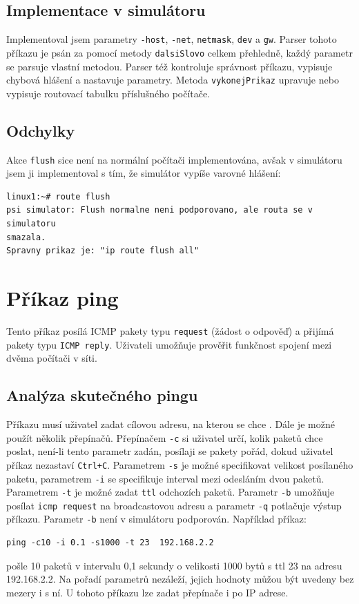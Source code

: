 \subsection{Implementace v simulátoru}

Implementoval jsem parametry \verb|-host|, \verb|-net|, \verb|netmask|, \verb|dev| a \verb|gw|. Parser tohoto příkazu je psán za pomocí metody \verb|dalsiSlovo| celkem přehledně, každý parametr se parsuje vlastní metodou. Parser též kontroluje správnost příkazu, vypisuje chybová hlášení a nastavuje parametry. Metoda \verb|vykonejPrikaz| upravuje nebo vypisuje routovací tabulku příslušného počítače.


\subsection{Odchylky}

Akce \verb|flush| sice není na normální počítači implementována, avšak v simulátoru jsem ji implementoval s tím, že simulátor vypíše varovné hlášení:
\begin{verbatim}
linux1:~# route flush
psi simulator: Flush normalne neni podporovano, ale routa se v simulatoru
smazala.
Spravny prikaz je: "ip route flush all"
\end{verbatim}




\section{Příkaz ping}

Tento příkaz posílá ICMP pakety typu \verb|request| (žádost o odpověď) a přijímá pakety typu \verb|ICMP reply|. Uživateli umožňuje prověřit funkčnost spojení mezi dvěma počítači v síti.


\subsection{Analýza skutečného pingu}

Příkazu musí uživatel zadat cílovou adresu, na kterou se chce . Dále je možné použít několik přepínačů. Přepínačem \verb|-c| si uživatel určí, kolik paketů chce poslat, není-li tento parametr zadán, posílaji se pakety pořád, dokud uživatel příkaz nezastaví \verb|Ctrl+C|. Parametrem \verb|-s| je možné specifikovat velikost posílaného paketu, parametrem \verb|-i| se specifikuje interval mezi odesláním dvou paketů. Parametrem \verb|-t| je možné zadat \verb|ttl| odchozích paketů. Parametr \verb|-b| umožňuje posílat \verb|icmp request| na broadcastovou adresu a parametr \verb|-q| potlačuje výstup příkazu. Parametr \verb|-b| není v simulátoru podporován. Například příkaz:
\begin{verbatim}
ping -c10 -i 0.1 -s1000 -t 23  192.168.2.2
\end{verbatim}
pošle 10 paketů v intervalu 0,1 sekundy o velikosti 1000 bytů s ttl 23 na adresu 192.168.2.2. Na pořadí parametrů nezáleží, jejich hodnoty můžou být uvedeny bez mezery i s ní. U tohoto příkazu lze zadat přepínače i po IP adrese.


